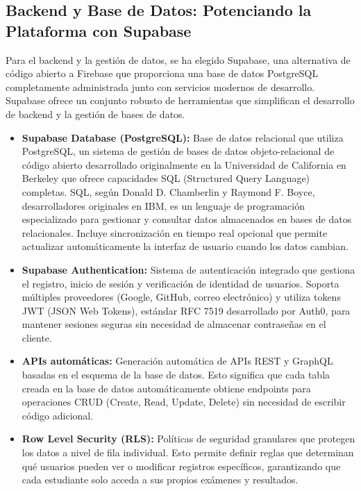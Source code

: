 \documentclass[12pt,a4paper]{report}
\begin{document}
\subsection{Backend y Base de Datos: Potenciando la Plataforma con Supabase}

Para el backend y la gestión de datos, se ha elegido Supabase, una alternativa de código abierto a Firebase que proporciona una base de datos PostgreSQL completamente administrada junto con servicios modernos de desarrollo. Supabase ofrece un conjunto robusto de herramientas que simplifican el desarrollo de backend y la gestión de bases de datos.

\begin{itemize}
\item \textbf{Supabase Database (PostgreSQL):} Base de datos relacional que utiliza PostgreSQL, un sistema de gestión de bases de datos objeto-relacional de código abierto desarrollado originalmente en la Universidad de California en Berkeley que ofrece capacidades SQL (Structured Query Language) completas. SQL, según Donald D. Chamberlin y Raymond F. Boyce, desarrolladores originales en IBM, es un lenguaje de programación especializado para gestionar y consultar datos almacenados en bases de datos relacionales. Incluye sincronización en tiempo real opcional que permite actualizar automáticamente la interfaz de usuario cuando los datos cambian.

\item \textbf{Supabase Authentication:} Sistema de autenticación integrado que gestiona el registro, inicio de sesión y verificación de identidad de usuarios. Soporta múltiples proveedores (Google, GitHub, correo electrónico) y utiliza tokens JWT (JSON Web Tokens), estándar RFC 7519 desarrollado por Auth0, para mantener sesiones seguras sin necesidad de almacenar contraseñas en el cliente.

\item \textbf{APIs automáticas:} Generación automática de APIs REST y GraphQL basadas en el esquema de la base de datos. Esto significa que cada tabla creada en la base de datos automáticamente obtiene endpoints para operaciones CRUD (Create, Read, Update, Delete) sin necesidad de escribir código adicional.

\item \textbf{Row Level Security (RLS):} Políticas de seguridad granulares que protegen los datos a nivel de fila individual. Esto permite definir reglas que determinan qué usuarios pueden ver o modificar registros específicos, garantizando que cada estudiante solo acceda a sus propios exámenes y resultados.
\end{itemize}
\end{document}
